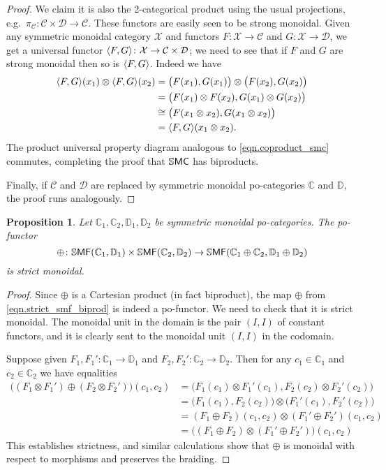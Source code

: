 \documentclass[11pt, oneside, article]{memoir}
\theoremstyle{plain}
\newtheorem{proposition}[theorem]{Proposition}
\theoremstyle{definition}
\theoremstyle{remark}
\newcommand{\cat}[1]{\mathcal{#1}}%
\newcommand{\ccat}[1]{\mathbb{#1}}%
\newcommand{\Cat}[1]{{\mathsf{#1}}}%
\newcommand{\CCat}[1]{\mathbb{\StrLeft{#1}{1}}\Cat{\StrGobbleLeft{#1}{1}}}%
\DeclarePairedDelimiter{\pair}{\langle}{\rangle}
\newcommand{\ssmf}{\CCat{SMF}}
\newcommand{\ssmc}{\CCat{SMC}}
\begin{document}
\begin{proof}
We claim it is also the 2-categorical product using the usual projections, e.g.\ $\pi_{\cat{C}}\colon\cat{C}\times\cat{D}\to\cat{C}$. These functors are easily seen to be strong monoidal. Given any symmetric monoidal category $\cat{X}$ and functors $F\colon\cat{X}\to\cat{C}$ and $G\colon\cat{X}\to\cat{D}$, we get a universal functor $\pair{F,G}\colon\cat{X}\to\cat{C}\times\cat{D}$; we need to see that if $F$ and $G$ are strong monoidal then so is $\pair{F,G}$. Indeed we have
\begin{align*}
	\pair{F,G}(x_1)\otimes\pair{F,G}(x_2)&=
	\big(F(x_1),G(x_1)\big)\otimes\big(F(x_2),G(x_2)\big)\\&=
	\big(F(x_1)\otimes F(x_2),G(x_1)\otimes G(x_2)\big)\\&\cong
	\big(F(x_1\otimes x_2),G(x_1\otimes x_2)\big)\\&=
	\pair{F,G}(x_1\otimes x_2).
\end{align*}
The product universal property diagram analogous to \cref{eqn.coproduct_smc} commutes, completing the proof that $\ssmc$ has biproducts.

Finally, if $\cat{C}$ and $\cat{D}$ are replaced by symmetric monoidal po-categories $\ccat{C}$ and $\ccat{D}$, the proof runs analogously.
\end{proof}

\begin{proposition}
Let $\ccat{C}_1,\ccat{C}_2,\ccat{D}_1,\ccat{D}_2$ be symmetric monoidal po-categories. The po-functor
\begin{equation}\label{eqn.strict_smf_biprod}\oplus\colon\ssmf(\ccat{C}_1,\ccat{D}_1)\times\ssmf(\ccat{C}_2,\ccat{D}_2)\to\ssmf(\ccat{C}_1\oplus\ccat{C}_2,\ccat{D}_1\oplus\ccat{D}_2)
\end{equation}
is strict monoidal.
\end{proposition}
\begin{proof}
Since $\oplus$ is a Cartesian product (in fact biproduct), the map $\oplus$ from \cref{eqn.strict_smf_biprod} is indeed a po-functor. We need to check that it is strict monoidal. The monoidal unit in the domain is the pair $(I,I)$ of constant functors, and it is clearly sent to the monoidal unit $(I,I)$ in the codomain.

Suppose given $F_1, F_1'\colon\ccat{C}_1\to\ccat{D}_1$ and $F_2,F_2'\colon\ccat{C}_2\to\ccat{D}_2$. Then for any $c_1\in\ccat{C}_1$ and $c_2\in\ccat{C}_2$ we have equalities
\begin{align*}
	\big((F_1\otimes F_1')\oplus(F_2\otimes F_2')\big)(c_1,c_2)&=
	\big(F_1(c_1)\otimes F_1'(c_1),F_2(c_2)\otimes F_2'(c_2)\big)\\&=
	\big(F_1(c_1),F_2(c_2)\big)\otimes\big(F_1'(c_1),F_2'(c_2)\big)\\&=
	(F_1\oplus F_2)(c_1,c_2)\otimes(F_1'\oplus F_2')(c_1,c_2)\\&=
	\big((F_1\oplus F_2)\otimes(F_1'\oplus F_2')\big)(c_1,c_2)
\end{align*}
This establishes strictness, and similar calculations show that $\oplus$ is monoidal with respect to morphisms and preserves the braiding. 
\end{proof}
\end{document}
